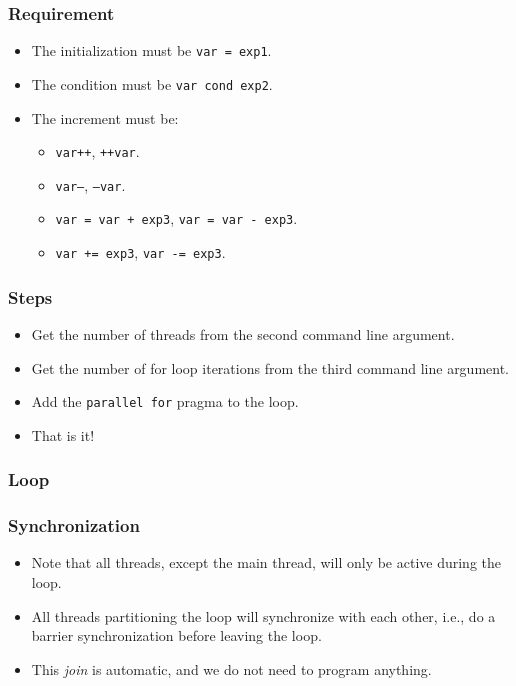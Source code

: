\documentclass{beamer}
\begin{document}
\begin{frame}
\frametitle{Requirement}
\begin{itemize}
\item The initialization must be {\tt var = exp1}.
\item The condition must be {\tt var cond exp2}.
\item The increment must be:
  \begin{itemize}
  \item {\tt var++}, {\tt ++var}.
  \item {\tt var--}, {\tt --var}.
  \item {\tt var = var + exp3}, {\tt var = var - exp3}.
  \item {\tt var += exp3}, {\tt var -= exp3}.
  \end{itemize}
\end{itemize}
\end{frame}

\begin{frame}
\frametitle{Steps}
\begin{itemize}
\item Get the number of threads from the second command line argument.
\item Get the number of for loop iterations from the third command
  line argument.
\item Add the {\tt parallel for} pragma to the loop.
\item That is it!
\end{itemize}
\end{frame}


\begin{frame}
\frametitle{Loop} 
\end{frame}

\begin{frame}
\frametitle{Synchronization}
\begin{itemize}
\item Note that all threads, except the main thread, will only be
  active during the loop.  
\item All threads partitioning the loop will synchronize with each
  other, i.e., do a barrier synchronization before leaving the loop.
\item This {\em join} is automatic, and we do not need to program
  anything.
\end{itemize}
\end{frame}
\end{document}
